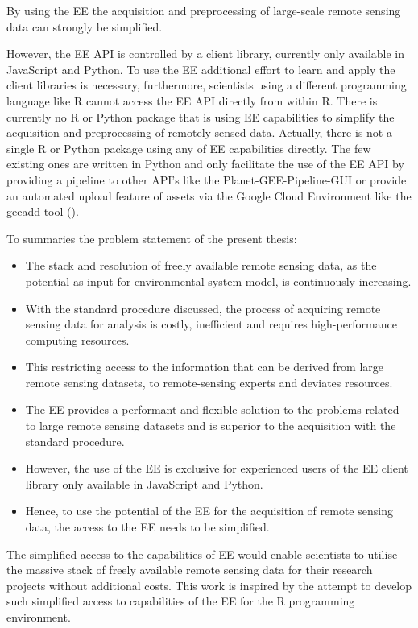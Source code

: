 By using the EE the acquisition and preprocessing of large-scale remote sensing data can strongly be simplified.

However, the EE API is controlled by a client library, currently only available in JavaScript and Python. To use the EE additional effort to learn and apply the client libraries is necessary, furthermore, scientists using a different programming language like R cannot access the EE API directly from within R.
There is currently no R or Python package that is using EE capabilities to simplify the acquisition and preprocessing of remotely sensed data. Actually, there is not a single R or Python package using any of EE capabilities directly. The few existing ones are written in Python and only facilitate the use of the EE API by providing a pipeline to other API's like the Planet-GEE-Pipeline-GUI or provide an automated upload feature of assets via the Google Cloud Environment like the geeadd tool (\cite{roy2017google}).

\newpage
To summaries the problem statement of the present thesis:

\begin{itemize}
	
	\item The stack and resolution of freely available remote sensing data, as the potential as input for environmental system model, is continuously increasing.
	\item With the standard procedure discussed, the process of acquiring remote sensing data for analysis is costly, inefficient and requires high-performance computing resources.
	\item This restricting access to the information that can be derived from large remote sensing datasets, to remote-sensing experts and deviates resources.
	\item The EE provides a performant and flexible solution to the problems related to large remote sensing datasets and is superior to the acquisition with the standard procedure.
	\item However, the use of the EE is exclusive for experienced users of the EE client library only available in JavaScript and Python.
	\item Hence, to use the potential of the EE for the acquisition of remote sensing data, the access to the EE needs to be simplified.
	
\end{itemize}

The simplified access to the capabilities of EE would enable scientists to utilise the massive stack of freely available remote sensing data for their research projects without additional costs. This work is inspired by the attempt to develop such simplified access to capabilities of the EE for the R programming environment.

